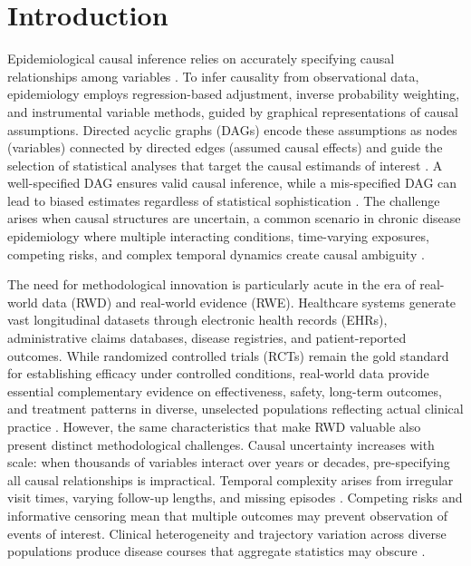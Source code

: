 \documentclass[sn-vancouver-num]{sn-jnl}
\begin{document}

\maketitle
\newpage

\section{Introduction}
Epidemiological causal inference relies on accurately specifying causal relationships among variables \citep{vanderweele2019,pearl2010}. To infer causality from observational data, epidemiology employs regression-based adjustment, inverse probability weighting, and instrumental variable methods, guided by graphical representations of causal assumptions. Directed acyclic graphs (DAGs) encode these assumptions as nodes (variables) connected by directed edges (assumed causal effects) and guide the selection of statistical analyses that target the causal estimands of interest \citep{pearl2009,greenland1999,hernan2004}. A well-specified DAG ensures valid causal inference, while a mis-specified DAG can lead to biased estimates regardless of statistical sophistication \citep{digitale2022,lederer2019,tennant2021}. The challenge arises when causal structures are uncertain, a common scenario in chronic disease epidemiology where multiple interacting conditions, time-varying exposures, competing risks, and complex temporal dynamics create causal ambiguity  \citep{hernan2019,glymour2019}.

The need for methodological innovation is particularly acute in the era of real-world data (RWD) and real-world evidence (RWE). Healthcare systems generate vast longitudinal datasets through electronic health records (EHRs), administrative claims databases, disease registries, and patient-reported outcomes. While randomized controlled trials (RCTs) remain the gold standard for establishing efficacy under controlled conditions, real-world data provide essential complementary evidence on effectiveness, safety, long-term outcomes, and treatment patterns in diverse, unselected populations reflecting actual clinical practice  \citep{sherman2016}. However, the same characteristics that make RWD valuable also present distinct methodological challenges. Causal uncertainty increases with scale: when thousands of variables interact over years or decades, pre-specifying all causal relationships is impractical. Temporal complexity arises from irregular visit times, varying follow-up lengths, and missing episodes \citep{casey2016}. Competing risks and informative censoring mean that multiple outcomes may prevent observation of events of interest. Clinical heterogeneity and trajectory variation across diverse populations produce disease courses that aggregate statistics may obscure \citep{burns2022}.
\end{document}
